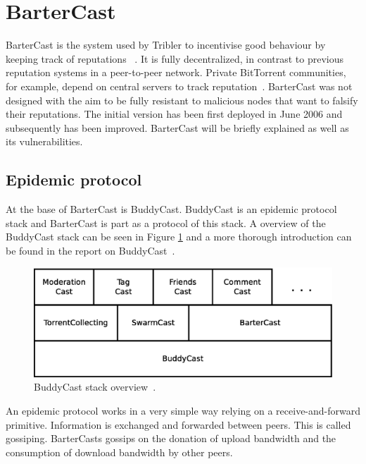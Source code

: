 \section{BarterCast}
\label{sect:bartercast}
BarterCast is the system used by Tribler to incentivise good behaviour by keeping track of reputations
~\cite{pouwelse-buddycast,meulpolder-bartercast,meulpolder-bartercast-paper,dumitrescu-tribler}.
It is fully decentralized, in contrast to previous reputation systems in a peer-to-peer network.
Private BitTorrent communities, for example, depend on central servers to track reputation~\cite{meulpolder-bartercast}.
BarterCast was not designed with the aim to be fully resistant to malicious nodes
that want to falsify their reputations.
The initial version has been first deployed in June 2006
and subsequently has been improved.
BarterCast will be briefly explained as well as its vulnerabilities.

\subsection{Epidemic protocol}
At the base of BarterCast is BuddyCast.
BuddyCast is an epidemic protocol stack and BarterCast is part as a protocol of this stack.
A overview of the BuddyCast stack can be seen in Figure \ref{fig:buddycast-stack}
and a more thorough introduction can be found in the report on BuddyCast~\cite{pouwelse-buddycast}.

\begin{figure}
	\centerline{\includegraphics[scale=0.3]{relatedWork/figs/buddycast-stack.eps}}
	\caption{BuddyCast stack overview~\cite{pouwelse-buddycast}.}
	\label{fig:buddycast-stack}
\end{figure}

An epidemic protocol works in a very simple way relying on a receive-and-forward primitive.
Information is exchanged and forwarded between peers.
This is called gossiping.
BarterCasts gossips on the donation of upload bandwidth
and the consumption of download bandwidth by other peers.

